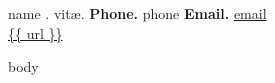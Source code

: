 \documentclass[letter]{article}
\begin{document}
{\huge {{ name }}. vit\ae.} \hfill {\small {\bf Phone.} {{ phone }}
{\bf Email.} \href{mailto: {{ email }} }{ {{email }} }} \\
\url{ {{ url }} }

{{ body }}
\end{document}
